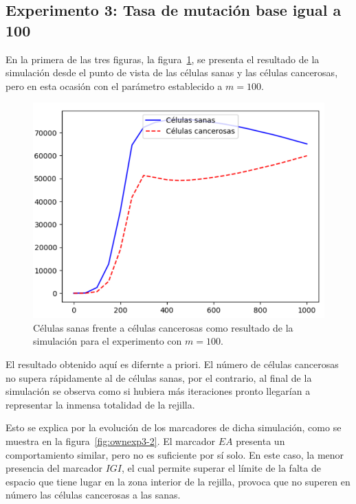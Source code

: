 \clearpage

\subsection{Experimento 3: Tasa de mutación base igual a 100}

En la primera de las tres figuras, la figura~\ref{fig:ownexp3-1}, se presenta el resultado
de la simulación desde el punto de vista de las células sanas y las células cancerosas,
pero en esta ocasión con el parámetro establecido a $m=100$.

\begin{figure}[h]
\centering
\includegraphics[scale=0.8]{figures/experiments/exp3/healthvscarcino}
\caption{Células sanas frente a células cancerosas como resultado de la simulación para el experimento con $m = 100$.}
\label{fig:ownexp3-1}
\end{figure}

El resultado obtenido aquí es difernte a priori. El número de células cancerosas
no supera rápidamente al de células sanas, por el contrario, al final de la simulación
se observa como si hubiera más iteraciones pronto llegarían a representar la inmensa
totalidad de la rejilla.

Esto se explica por la evolución de los marcadores de dicha simulación, como se muestra en
la figura~\ref{fig:ownexp3-2}. El marcador $EA$ presenta un comportamiento similar, pero
no es suficiente por sí solo. En este caso, la menor presencia del marcador $IGI$, el cual
permite superar el límite de la falta de espacio que tiene lugar en la zona interior de la rejilla,
provoca que no superen en número las células cancerosas a las sanas.

